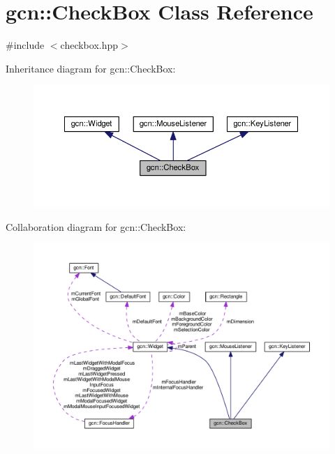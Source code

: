 \hypertarget{classgcn_1_1CheckBox}{}\section{gcn\+:\+:Check\+Box Class Reference}
\label{classgcn_1_1CheckBox}


{\ttfamily \#include $<$checkbox.\+hpp$>$}



Inheritance diagram for gcn\+:\+:Check\+Box\+:\nopagebreak
\begin{figure}[H]
\begin{center}
\leavevmode
\includegraphics[width=350pt]{classgcn_1_1CheckBox__inherit__graph}
\end{center}
\end{figure}


Collaboration diagram for gcn\+:\+:Check\+Box\+:\nopagebreak
\begin{figure}[H]
\begin{center}
\leavevmode
\includegraphics[width=350pt]{classgcn_1_1CheckBox__coll__graph}
\end{center}
\end{figure}
